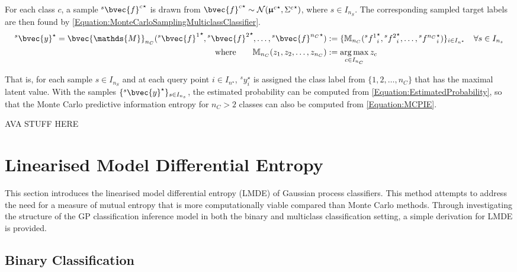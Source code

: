 			For each class $c$, a sample ${^{s}}{\bvec{f}^{c}}^{\star}$ is drawn from ${\bvec{f}^{c}}^{\star} \sim \mathcal{N}({\vec{\upmu}^{c}}^{\star}, {\Sigma^{c}}^{\star})$, where $s \in I_{n_{S}}$. The corresponding sampled target labels are then found by \eqref{Equation:MonteCarloSamplingMulticlassClassifier}. \begin{equation}
				\begin{aligned}
					{^{s}}\bvec{y}^{\star} = \bvec{\mathds{M}}_{n_{C}}({^{s}}{\bvec{f}^{1}}^{\star}, {^{s}}{\bvec{f}^{2}}^{\star}, \dots, {^{s}}{\bvec{f}^{n_{C}}}^{\star}) &:= \{\mathbb{M}_{n_{C}}({^{s}}{f^{1}}^{\star}_{i}, {^{s}}{f^{2}}^{\star}_{i}, \dots, {^{s}}{f^{n_{C}}}^{\star}_{i})\}_{i \in I_{n^{\star}}} \quad \forall s \in I_{n_{s}} \\
					\mathrm{where} \qquad \mathbb{M}_{n_{C}}(z_{1}, z_{2}, \dots, z_{n_{C}}) &:= \argmax_{c \in I_{n_{C}}} z_{c}
				\end{aligned}
			\label{Equation:MonteCarloSamplingMulticlassClassifier}
			\end{equation}
			
			That is, for each sample $s \in I_{n_{S}}$ and at each query point $i \in I_{n^{\star}}$, ${^{s}}y^{\star}_{i}$ is assigned the class label from $\{1, 2, \dots, n_{C}\}$ that has the maximal latent value. With the samples $\{{^{s}}\bvec{y}^{\star}\}_{s \in I_{n_{s}}}$, the estimated probability can be computed from \eqref{Equation:EstimatedProbability}, so that the Monte Carlo predictive information entropy for $n_{C} > 2$ classes can also be computed from \eqref{Equation:MCPIE}.
			
			AVA STUFF HERE
			
	\section{Linearised Model Differential Entropy}
	\label{InformativeSeafloorExploration:LMDE}
	
		This section introduces the linearised model differential entropy (LMDE) of Gaussian process classifiers. This method attempts to address the need for a measure of mutual entropy that is more computationally viable compared than Monte Carlo methods. Through investigating the structure of the GP classification inference model in both the binary and multiclass classification setting, a simple derivation for LMDE is provided.
		
		\subsection{Binary Classification}
		\label{InformativeSeafloorExploration:LMDE:Binary}
		
